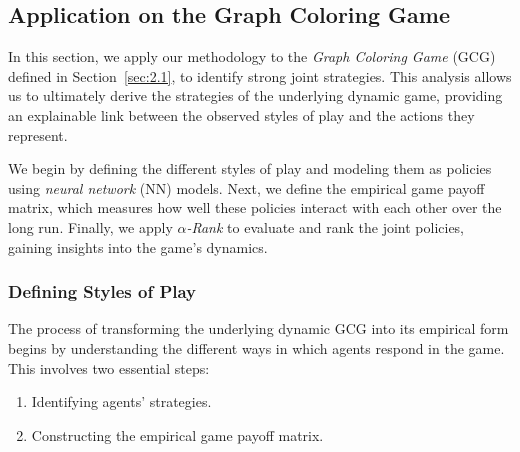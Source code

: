 \subsection{Application on the Graph Coloring Game}

    In this section, we apply our methodology to the \emph{Graph Coloring Game} (GCG) defined in Section~\ref{sec:2.1}, to identify strong joint strategies. This analysis allows us to ultimately derive the strategies of the underlying dynamic game, providing an explainable link between the observed styles of play and the actions they represent.\tinydouble

    \noindent
    We begin by defining the different styles of play and modeling them as policies using \emph{neural network} (NN) models. Next, we define the empirical game payoff matrix, which measures how well these policies interact with each other over the long run. Finally, we apply \emph{$\alpha$-Rank} to evaluate and rank the joint policies, gaining insights into the game's dynamics.

    \subsubsection{Defining Styles of Play}
    \label{sec:5.1}

        The process of transforming the underlying dynamic GCG into its empirical form begins by understanding the different ways in which agents respond in the game. This involves two essential steps:
        \begin{enumerate}
            \item Identifying agents' strategies.
            \item Constructing the empirical game payoff matrix.
        \end{enumerate}

